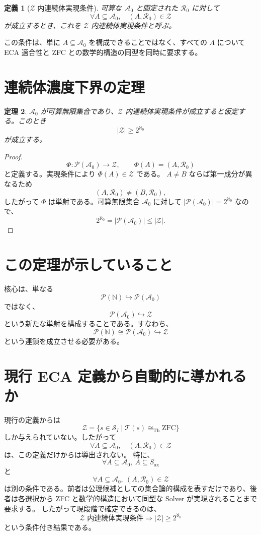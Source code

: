 \documentclass[a4paper,11pt]{article}
\newtheorem{definition}{定義}[section]
\newtheorem{theorem}[definition]{定理}
\newcommand{\Solver}{\mathcal{S}}
\newcommand{\Ax}{S_{\mathrm{ax}}}
\newcommand{\Pow}{\mathcal{P}}
\begin{document}
\begin{definition}[$\mathcal{Z}$ 内連続体実現条件]
可算な $\mathcal{A}_0$ と固定された $\mathcal{R}_0$ に対して
\[
\boxed{\forall A\subseteq\mathcal{A}_0,\quad (A,\mathcal{R}_0)\in\mathcal{Z}}
\]
が成立するとき、これを $\mathcal{Z}$ 内連続体実現条件と呼ぶ。
\end{definition}
この条件は、単に $A\subseteq\mathcal{A}_0$ を構成できることではなく、すべての $A$ について ECA 適合性と ZFC との数学的構造の同型を同時に要求する。
\section{連続体濃度下界の定理}
\begin{theorem}
$\mathcal{A}_0$ が可算無限集合であり、$\mathcal{Z}$ 内連続体実現条件が成立すると仮定する。このとき
\[
\boxed{|\mathcal{Z}|\geq2^{\aleph_0}}
\]
が成立する。
\end{theorem}
\begin{proof}
\[
\Phi:\Pow(\mathcal{A}_0)\to\mathcal{Z},\qquad \Phi(A)=(A,\mathcal{R}_0)
\]
と定義する。実現条件により $\Phi(A)\in\mathcal{Z}$ である。
$A\neq B$ ならば第一成分が異なるため
\[
(A,\mathcal{R}_0)\neq(B,\mathcal{R}_0),
\]
したがって $\Phi$ は単射である。可算無限集合 $\mathcal{A}_0$ に対して $|\Pow(\mathcal{A}_0)|=2^{\aleph_0}$ なので、
\[
2^{\aleph_0}=|\Pow(\mathcal{A}_0)|\leq|\mathcal{Z}|.
\]
\end{proof}

\section{この定理が示していること}
核心は、単なる
\[
\Pow(\mathbb{N})\hookrightarrow\Pow(\mathcal{A}_0)
\]
ではなく、
\[
\Pow(\mathcal{A}_0)\hookrightarrow\mathcal{Z}
\]
という新たな単射を構成することである。すなわち、
\[
\Pow(\mathbb{N})\cong\Pow(\mathcal{A}_0)\hookrightarrow\mathcal{Z}
\]
という連鎖を成立させる必要がある。

\section{現行 ECA 定義から自動的に導かれるか}
現行の定義からは
\[
\mathcal{Z}=\{s\in\Solver_I\mid\mathcal{T}(s)\cong_{\mathrm{Th}}\mathrm{ZFC}\}
\]
しか与えられていない。したがって
\[
\forall A\subseteq\mathcal{A}_0,\quad(A,\mathcal{R}_0)\in\mathcal{Z}
\]
は、この定義だけからは導出されない。
特に、
\[
\forall A\subseteq\mathcal{A}_0,\ A\subseteq\Ax
\]
と
\[
\forall A\subseteq\mathcal{A}_0,\ (A,\mathcal{R}_0)\in\mathcal{Z}
\]
は別の条件である。前者は公理候補としての集合論的構成を表すだけであり、後者は各選択から ZFC と数学的構造において同型な Solver が実現されることまで要求する。
したがって現段階で確定できるのは、
\[
\boxed{\text{$\mathcal{Z}$ 内連続体実現条件}\Longrightarrow |\mathcal{Z}|\geq2^{\aleph_0}}
\]
という条件付き結果である。
\end{document}
